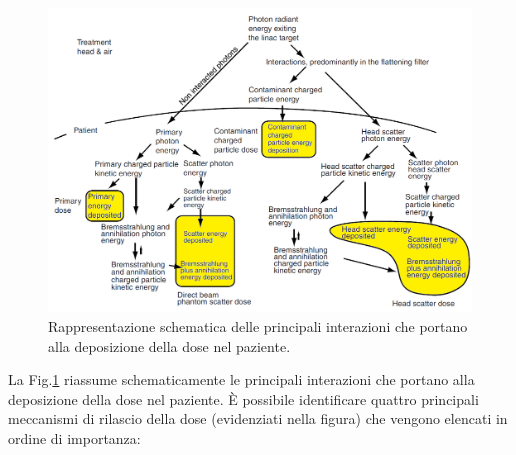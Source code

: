 \begin{figure}
\centering
\includegraphics[width=.9\textwidth]{./cap1/processes.png}
\caption{Rappresentazione schematica delle principali interazioni che portano alla deposizione della dose nel paziente.}
\label{fig:processes}
\end{figure}
\vspace{.2cm}
La Fig.\ref{fig:processes} riassume schematicamente le principali interazioni che portano alla deposizione della dose nel paziente. \`{E} possibile identificare quattro principali meccanismi di rilascio della dose (evidenziati nella figura) che vengono elencati in ordine di importanza:
